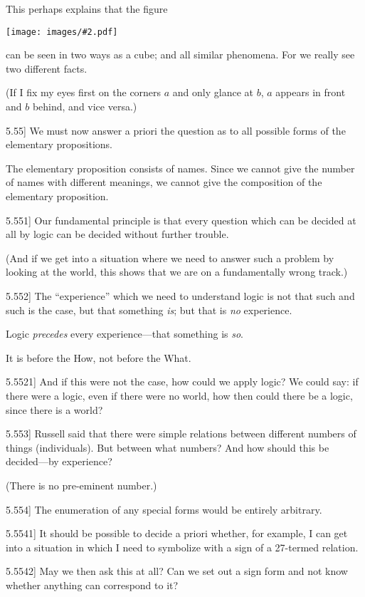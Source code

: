 \documentclass[12pt,oneside]{book}[2007/10/19]
\newcommand{\PropositionE}[2]{%
  \item[\phantomsection\label{PropE:#1}\PropGRef{#1}] #2%
}
\newcommand{\PropGRef}[1]{\hyperref[PropG:#1]{#1}}
\newcommand{\Illustration}[2][0.3\textwidth]{%
  \begin{center}
  \texttt{[image: images/\#2.pdf]}
  \end{center}
}
\begin{document}
\begin{propositions}
{This perhaps explains that the figure
\Illustration{cube}
can be seen in two ways as a cube; and all similar
phenomena. For we really see two different facts.

(If I fix my eyes first on the corners $a$ and only
glance at $b$, $a$ appears in front and $b$ behind, and
vice versa.)}


\PropositionE{5.55}
{We must now answer a priori the question
as to all possible forms of the elementary propositions.

The elementary proposition consists of names.
Since we cannot give the number of names with
different meanings, we cannot give the composition
of the elementary proposition.}


\PropositionE{5.551}
{Our fundamental principle is that every question
which can be decided at all by logic can be decided
without further trouble.

(And if we get into a situation where we need
to answer such a problem by looking at the world,
this shows that we are on a fundamentally wrong
track.)}


\PropositionE{5.552}
{The ``experience'' which we need to understand
logic is not that such and such is the
case, but that something \emph{is}; but that is \emph{no} experience.

Logic \emph{precedes} every experience---that something
is \emph{so}.

It is before the How, not before the What.}


\PropositionE{5.5521}
{And if this were not the case, how could
we apply logic? We could say: if there
were a logic, even if there were no world,
how then could there be a logic, since there is a
world?}


\PropositionE{5.553}
{Russell said that there were simple relations
between different numbers of things (individuals).
But between what numbers? And how should
this be decided---by experience?

(There is no pre-eminent number.)}


\PropositionE{5.554}
{The enumeration of any special forms would
be entirely arbitrary.}


\PropositionE{5.5541}
{It should be possible to decide a priori whether,
for example, I can get into a situation in which
I need to symbolize with a sign of a 27-termed
relation.}


\PropositionE{5.5542}
{May we then ask this at all? Can we set out
a sign form and not know whether anything can
correspond to it?

}
\end{propositions}
\end{document}
